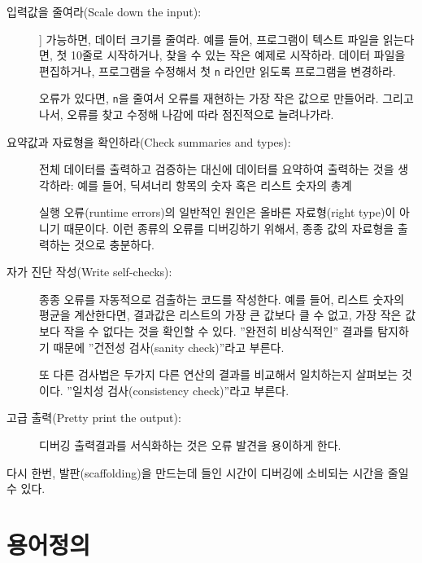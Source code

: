 \begin{description}

\item[입력값을 줄여라(Scale down the input):]]
가능하면, 데이터 크기를 줄여라. 예를 들어, 프로그램이 텍스트 파일을 읽는다면, 첫 10줄로 시작하거나, 찾을 수 있는 작은 예제로 시작하라.
데이터 파일을 편집하거나, 프로그램을 수정해서 첫 {\tt n} 라인만 읽도록 프로그램을 변경하라.

오류가 있다면, {\tt n}을 줄여서 오류를 재현하는 가장 작은 값으로 만들어라.
그리고 나서, 오류를 찾고 수정해 나감에 따라 점진적으로 늘려나가라.

\item[요약값과 자료형을 확인하라(Check summaries and types):] 
전체 데이터를 출력하고 검증하는 대신에 데이터를 요약하여 출력하는 것을 생각하라: 예를 들어, 딕셔너리 항목의 숫자 혹은 리스트 숫자의 총계

실행 오류(runtime errors)의 일반적인 원인은 올바른 자료형(right type)이 아니기 때문이다. 
이런 종류의 오류를 디버깅하기 위해서, 종종 값의 자료형을 출력하는 것으로 충분하다.

\item[자가 진단 작성(Write self-checks):]

종종 오류를 자동적으로 검출하는 코드를 작성한다. 
예를 들어, 리스트 숫자의 평균을 계산한다면, 결과값은 리스트의 가장 큰 값보다 클 수 없고, 가장 작은 값보다 작을 수 없다는 것을 확인할 수 있다. 
''완전히 비상식적인'' 결과를 탐지하기 때문에 ''건전성 검사(sanity check)''라고 부른다.


또 다른 검사법은 두가지 다른 연산의 결과를 비교해서 일치하는지 살펴보는 것이다. 
''일치성 검사(consistency check)''라고 부른다.

\item[고급 출력(Pretty print the output):] 디버깅 출력결과를 서식화하는 것은 오류 발견을 용이하게 한다.

\end{description}

다시 한번, 발판(scaffolding)을 만드는데 들인 시간이 디버깅에 소비되는 시간을 줄일 수 있다.


\section{용어정의}

